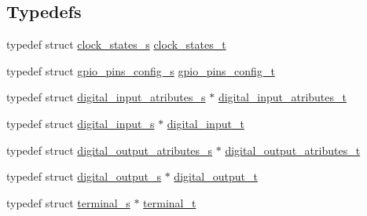 \subsection*{Typedefs}
\begin{DoxyCompactItemize}
\item 
typedef struct \hyperlink{structclock__states__s}{clock\+\_\+states\+\_\+s} \hyperlink{group__hal_gaae8d32ee89693684379856530d8a1241}{clock\+\_\+states\+\_\+t}
\item 
typedef struct \hyperlink{structgpio__pins__config__s}{gpio\+\_\+pins\+\_\+config\+\_\+s} \hyperlink{group__hal_ga7eca1221f3682873bc58bc23f56ab861}{gpio\+\_\+pins\+\_\+config\+\_\+t}
\item 
typedef struct \hyperlink{structdigital__input__atributes__s}{digital\+\_\+input\+\_\+atributes\+\_\+s} $\ast$ \hyperlink{group__hal_ga425db4b2c52be0608edec9a314976335}{digital\+\_\+input\+\_\+atributes\+\_\+t}
\item 
typedef struct \hyperlink{structdigital__input__s}{digital\+\_\+input\+\_\+s} $\ast$ \hyperlink{group__hal_gaa88780f43e331bbd1d6069d75ad68fcf}{digital\+\_\+input\+\_\+t}
\item 
typedef struct \hyperlink{structdigital__output__atributes__s}{digital\+\_\+output\+\_\+atributes\+\_\+s} $\ast$ \hyperlink{group__hal_ga52de0d94c690b3251abf626bc86dfed9}{digital\+\_\+output\+\_\+atributes\+\_\+t}
\item 
typedef struct \hyperlink{structdigital__output__s}{digital\+\_\+output\+\_\+s} $\ast$ \hyperlink{group__hal_ga3e63b19d3d0dbfbfb2c50b3ac1f69aa0}{digital\+\_\+output\+\_\+t}
\item 
typedef struct \hyperlink{structterminal__s}{terminal\+\_\+s} $\ast$ \hyperlink{group__hal_ga64d2a4cb83c256a6ace36ce64935997f}{terminal\+\_\+t}
\end{DoxyCompactItemize}
